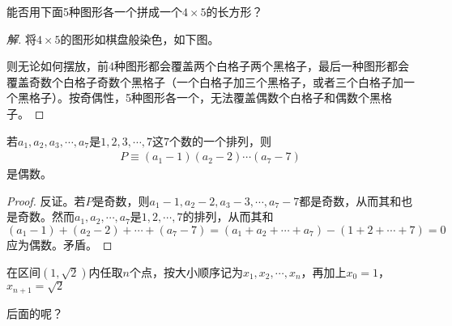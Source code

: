 \begin{example}
  能否用下面5种图形各一个拼成一个$4\times5$的长方形？

  \centering
\end{example}
\begin{proof}[解]
  将$4\times5$的图形如棋盘般染色，如下图。
  \begin{center}
  \end{center}
  则无论如何摆放，前4种图形都会覆盖两个白格子两个黑格子，最后一种图形都会覆盖奇数个白格子奇数个黑格子（一个白格子加三个黑格子，或者三个白格子加一个黑格子）。按奇偶性，5种图形各一个，无法覆盖偶数个白格子和偶数个黑格子。
\end{proof}

\begin{example}
  若$a_1,a_2,a_3,\cdots,a_7$是$1,2,3,\cdots,7$这$7$个数的一个排列，则
  \begin{align*}
    P\equiv (a_1 - 1)(a_2-2)\cdots(a_7-7)
  \end{align*}
  是偶数。
\end{example}
\begin{proof}
  反证。若$P$是奇数，则$a_1-1, a_2-2, a_3-3,\cdots, a_7-7$都是奇数，从而其和也是奇数。然而$a_1,a_2,\cdots,a_7$是$1,2,\cdots,7$的排列，从而其和$(a_1-1) + (a_2-2) + \cdots + (a_7-7)=(a_1+a_2+\cdots + a_7)-(1+2+\cdots+7)=0$应为偶数。矛盾。
\end{proof}

\begin{example}
  在区间$(1,\sqrt2)$内任取$n$个点，按大小顺序记为$x_1,x_2,\cdots,x_n$，再加上$x_0=1$，$x_{n+1}=\sqrt2$

  {\color{red}后面的呢？}
\end{example}

